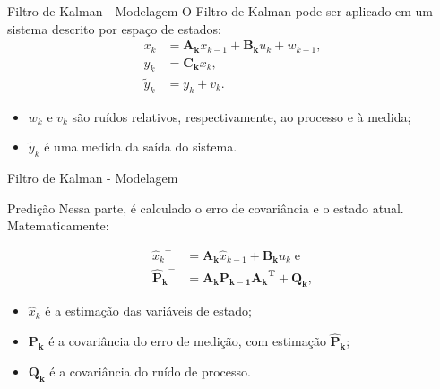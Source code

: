 \documentclass[10pt]{beamer}
\begin{document}
\begin{frame}[fragile]{Filtro de Kalman - Modelagem}
O Filtro de Kalman pode ser aplicado em um sistema descrito por espaço de estados:
\begin{align}
\label{KalmanEq1}
	x_k &= \mathbf{A_k} x_{k-1} + \mathbf{B_k} u_k + w_{k-1}, \\
	\label{KalmanEq2}
	y_k &= \mathbf{C_k} x_k, \\
	\label{KalmanEq3}
	\tilde{y}_k &= y_k + v_k.
\end{align}
\begin{itemize}
\item $w_k$ e $v_k$ são ruídos relativos, respectivamente, ao processo e à medida;
\item $\tilde{y}_k$ é uma medida da saída do sistema.
\end{itemize}
\end{frame}

\begin{frame}[fragile]{Filtro de Kalman - Modelagem}
\begin{block}{Predição}
Nessa parte, é calculado o erro de covariância e o estado atual. Matematicamente:

\begin{align}
\label{KalmanEq4} {\hat{x}_{k}}^{-} &= \mathbf{A_k} \hat{x}_{k-1} + \mathbf{B_k} u_k\;\mathrm{e} \\
	\label{KalmanEq5} \mathbf{{\hat{P}_{k}}^{-}} &= \mathbf{A_k}\mathbf{P_{k-1}}\mathbf{{A_k}^T} + \mathbf{Q_k},
\end{align}

\begin{itemize}
\item $\hat{x}_{k}$ é a estimação das variáveis de estado;
\item $\mathbf{P_k}$ é a covariância do erro de medição, com estimação $\mathbf{{\hat{P}_{k}}}$;
\item $\mathbf{Q_k}$ é a covariância do ruído de processo.
\end{itemize}

\end{block}

\end{frame}
\end{document}
